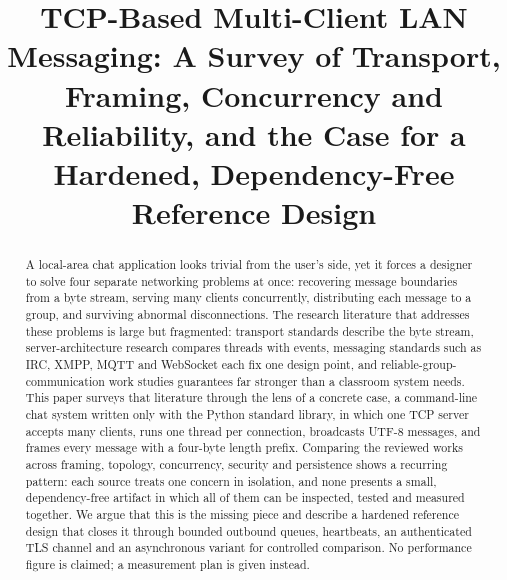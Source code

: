 \documentclass[conference]{IEEEtran}
\begin{document}
\title{TCP-Based Multi-Client LAN Messaging: A Survey of Transport, Framing, Concurrency and Reliability, and the Case for a Hardened, Dependency-Free Reference Design}

\author{
}

\maketitle

\begin{abstract}
A local-area chat application looks trivial from the user's side, yet it forces a designer to solve four separate networking problems at once: recovering message boundaries from a byte stream, serving many clients concurrently, distributing each message to a group, and surviving abnormal disconnections. The research literature that addresses these problems is large but fragmented: transport standards describe the byte stream, server-architecture research compares threads with events, messaging standards such as IRC, XMPP, MQTT and WebSocket each fix one design point, and reliable-group-communication work studies guarantees far stronger than a classroom system needs. This paper surveys that literature through the lens of a concrete case, a command-line chat system written only with the Python standard library, in which one TCP server accepts many clients, runs one thread per connection, broadcasts UTF-8 messages, and frames every message with a four-byte length prefix. Comparing the reviewed works across framing, topology, concurrency, security and persistence shows a recurring pattern: each source treats one concern in isolation, and none presents a small, dependency-free artifact in which all of them can be inspected, tested and measured together. We argue that this is the missing piece and describe a hardened reference design that closes it through bounded outbound queues, heartbeats, an authenticated TLS channel and an asynchronous variant for controlled comparison. No performance figure is claimed; a measurement plan is given instead.
\end{abstract}
\end{document}
